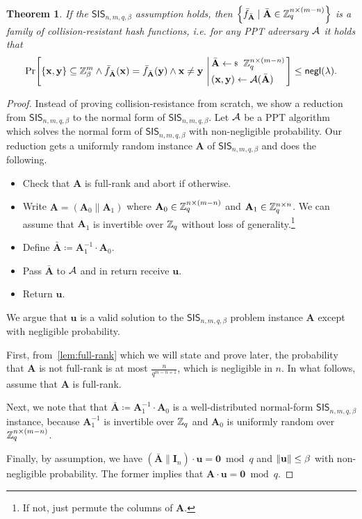 \documentclass[10pt,twoside]{article}
\newcounter{lecnum}
\newtheorem{theorem}{Theorem}[lecnum]
\renewcommand{\vec}[1]{\mathbf{#1}}
\newcommand{\mat}[1]{\mathbf{#1}}
\newcommand{\SIS}{\mathsf{SIS}}
\begin{document}
\begin{theorem}
    If the $\SIS_{n,m,q,\beta}$ assumption holds, then $\set{\bar{f}_{\bar{\mat{A}}} \mid \bar{\mat{A}} \in \ZZ_q^{n \times (m-n)}}$ is a family of collision-resistant hash functions, i.e. for any PPT adversary $\mathcal{A}$ it holds that
    \[
        \condprob{\set{\vec{x}, \vec{y}} \subseteq \ZZ_\beta^m \land \bar{f}_{\bar{\mat{A}}}(\vec{x}) = \bar{f}_{\bar{\mat{A}}}(\vec{y}) \land \vec{x} \neq \vec{y}}{
            \begin{aligned}
                &\bar{\mat{A}} \sample \ZZ_q^{n \times (m-n)} \\
                &(\vec{x}, \vec{y}) \gets \adv(\bar{\mat{A}})
            \end{aligned}
        }
        \leq \negl.
    \]
\end{theorem}

\begin{proof}
    Instead of proving collision-resistance from scratch, we show a reduction from $\SIS_{n,m,q,\beta}$ to the normal form of $\SIS_{n,m,q,\beta}$.
    Let $\mathcal{A}$ be a PPT algorithm which solves the normal form of $\SIS_{n,m,q,\beta}$ with non-negligible probability.
    Our reduction gets a uniformly random instance $\mat{A}$ of $\SIS_{n,m,q,\beta}$ and does the following.
    \begin{itemize}
        \item Check that $\mat{A}$ is full-rank and abort if otherwise.
        \item Write $\mat{A} = \left( \mat{A}_0 \| \mat{A}_1 \right)$ where $\mat{A}_0 \in \ZZ_q^{n \times (m-n)}$ and $\mat{A}_1 \in \ZZ_q^{n \times n}$. We can assume that $\mat{A}_1$ is invertible over $\mathbb{Z}_q$ without loss of generality.\footnote{If not, just permute the columns of $\mat{A}$.}
        \item Define $\bar{\mat{A}} \coloneqq \mat{A}_1^{-1} \cdot \mat{A}_0$.
        \item Pass $\bar{\mat{A}}$ to $\mathcal{A}$ and in return receive $\vec{u}$.
        \item Return $\vec{u}$.
    \end{itemize}
    We argue that $\vec{u}$ is a valid solution to the $\SIS_{n,m,q,\beta}$ problem instance $\mat{A}$ except with negligible probability.

    First, from~\cref{lem:full-rank} which we will state and prove later, the probability that $\mat{A}$ is not full-rank is at most $\frac{n}{q^{m-n+1}}$, which is negligible in $n$. In what follows, assume that $\mat{A}$ is full-rank.

    Next, we note that that $\bar{\mat{A}} \coloneqq \mat{A}_1^{-1} \cdot \mat{A}_0$ is a well-distributed normal-form $\SIS_{n,m,q,\beta}$ instance, because $\mat{A}_1^{-1}$ is invertible over $\mathbb{Z}_q$ and $\mat{A}_0$ is uniformly random over $\mathbb{Z}_q^{n \times (m-n)}$.

    Finally, by assumption, we have $\left( \bar{\mat{A}} \| \mat{I}_n \right) \cdot \vec{u} = \vec{0} \bmod q$ and $\norm{\vec{u}} \leq \beta$ with non-negligible probability. The former implies that $\mat{A} \cdot \vec{u} = \vec{0} \bmod q$.
\end{proof}
\end{document}
